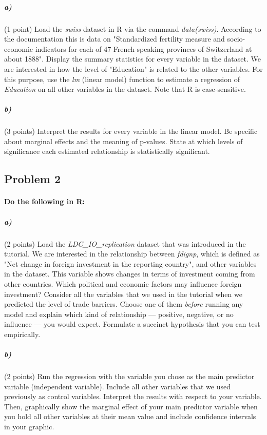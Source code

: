 \documentclass[12pt,letter]{article}
\begin{document}
\subparagraph{a)} (1 point) Load the \textit{swiss} dataset in R via the command \textit{data(swiss)}. According to the documentation this is data on "Standardized fertility measure and socio-economic indicators for each of 47 French-speaking provinces of Switzerland at about 1888". Display the summary statistics for every variable in the dataset. We are interested in how the level of "Education" is related to the other variables. For this purpose, use the \textit{lm} (linear model) function to estimate a regression of \textit{Education} on all other variables in the dataset. Note that R is case-sensitive.

\subparagraph{b)} (3 points) Interpret the results for every variable in the linear model. Be specific about marginal effects and the meaning of p-values. State at which levels of significance each estimated relationship is statistically significant.



\subsection*{Problem 2}

\paragraph{Do the following in R:}

\subparagraph{a)} (2 points) Load the \textit{LDC\_IO\_replication} dataset that was introduced in the tutorial. We are interested in the relationship between \textit{fdignp}, which is defined as "Net change in foreign investment in the reporting country", and other variables in the dataset. This variable shows changes in terms of investment coming from other countries. Which political and economic factors may influence foreign investment? Consider all the variables that we used in the tutorial when we predicted the level of trade barriers. Choose one of them \textit{before} running any model and explain which kind of relationship --- positive, negative, or no influence --- you would expect. Formulate a succinct hypothesis that you can test empirically.

\subparagraph{b)} (2 points) Run the regression with the variable you chose as the main predictor variable (independent variable). Include all other variables that we used previously as control variables. Interpret the results with respect to your variable. Then, graphically show the marginal effect of your main predictor variable when you hold all other variables at their mean value and include confidence intervals in your graphic.
\end{document}
